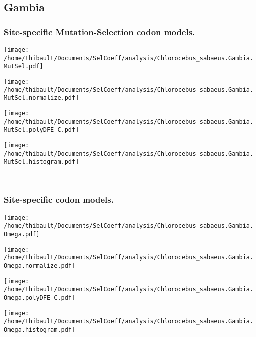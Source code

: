 \subsection{Gambia} 
 
\subsubsection*{Site-specific Mutation-Selection codon models.} 
\begin{minipage}{0.49\linewidth} 
\texttt{[image: /home/thibault/Documents/SelCoeff/analysis/Chlorocebus\_sabaeus.Gambia.MutSel.pdf]} 
\end{minipage}
\begin{minipage}{0.49\linewidth} 
\texttt{[image: /home/thibault/Documents/SelCoeff/analysis/Chlorocebus\_sabaeus.Gambia.MutSel.normalize.pdf]} 
\end{minipage}
\begin{minipage}{0.49\linewidth} 
\texttt{[image: /home/thibault/Documents/SelCoeff/analysis/Chlorocebus\_sabaeus.Gambia.MutSel.polyDFE\_C.pdf]} 
\end{minipage}
\begin{minipage}{0.49\linewidth} 
\texttt{[image: /home/thibault/Documents/SelCoeff/analysis/Chlorocebus\_sabaeus.Gambia.MutSel.histogram.pdf]} 
\end{minipage}
\\ 
\subsubsection*{Site-specific codon models.} 
\begin{minipage}{0.49\linewidth} 
\texttt{[image: /home/thibault/Documents/SelCoeff/analysis/Chlorocebus\_sabaeus.Gambia.Omega.pdf]} 
\end{minipage}
\begin{minipage}{0.49\linewidth} 
\texttt{[image: /home/thibault/Documents/SelCoeff/analysis/Chlorocebus\_sabaeus.Gambia.Omega.normalize.pdf]} 
\end{minipage}
\begin{minipage}{0.49\linewidth} 
\texttt{[image: /home/thibault/Documents/SelCoeff/analysis/Chlorocebus\_sabaeus.Gambia.Omega.polyDFE\_C.pdf]} 
\end{minipage}
\begin{minipage}{0.49\linewidth} 
\texttt{[image: /home/thibault/Documents/SelCoeff/analysis/Chlorocebus\_sabaeus.Gambia.Omega.histogram.pdf]} 
\end{minipage}
\\ 
